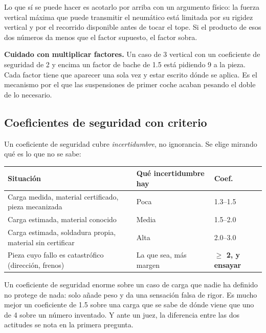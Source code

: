 Lo que sí se puede hacer es acotarlo por arriba con un argumento físico: la
fuerza vertical máxima que puede transmitir el neumático está limitada por su
rigidez vertical y por el recorrido disponible antes de tocar el tope. Si el
producto de esos dos números da menos que el factor supuesto, el factor sobra.

\begin{ojo}
\textbf{Cuidado con multiplicar factores.} Un caso de \SI{3}{\gacc} vertical con
un coeficiente de seguridad de \num{2} y encima un factor de bache de \num{1.5}
está pidiendo \SI{9}{\gacc} a la pieza. Cada factor tiene que aparecer una sola
vez y estar escrito dónde se aplica. Es el mecanismo por el que las suspensiones
de primer coche acaban pesando el doble de lo necesario.
\end{ojo}

\subsection{Coeficientes de seguridad con criterio}

Un coeficiente de seguridad cubre \emph{incertidumbre}, no ignorancia. Se elige
mirando qué es lo que no se sabe:

\begin{center}
\begin{tabularx}{\textwidth}{@{}lXl@{}}
\toprule
\textbf{Situación} & \textbf{Qué incertidumbre hay} & \textbf{Coef.} \\
\midrule
Carga medida, material certificado, pieza mecanizada & Poca & \numrange{1.3}{1.5} \\
Carga estimada, material conocido & Media & \numrange{1.5}{2.0} \\
Carga estimada, soldadura propia, material sin certificar & Alta & \numrange{2.0}{3.0} \\
Pieza cuyo fallo es catastrófico (dirección, frenos) & La que sea, más margen & \textbf{$\geq$ 2, y ensayar} \\
\bottomrule
\end{tabularx}
\end{center}

\begin{clave}
Un coeficiente de seguridad enorme sobre un caso de carga que nadie ha definido
no protege de nada: solo añade peso y da una sensación falsa de rigor. Es mucho
mejor un coeficiente de \num{1.5} sobre una carga que se sabe de dónde viene que
uno de \num{4} sobre un número inventado. Y ante un juez, la diferencia entre
las dos actitudes se nota en la primera pregunta.
\end{clave}

